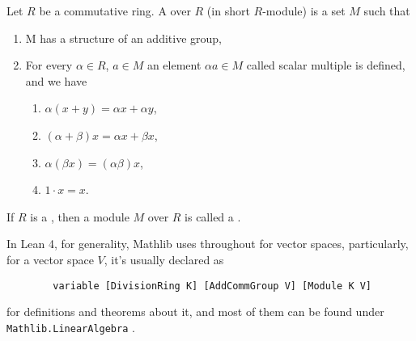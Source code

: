 \begin{definition}[Module]
    \label{Module}
    \leanok

    Let $R$ be a commutative ring. A  over $R$ (in short $R$-module) is a set $M$ such that

    \begin{enumerate}
      \item M has a structure of an additive group,
    
      \item For every $\alpha \in R$, $a \in M$ an element $\alpha a \in M$ called scalar multiple is defined, and we have
      
        \begin{enumerate}[i]
            \item $\alpha(x+y)=\alpha x+\alpha y$,
            \item $(\alpha+\beta) x=\alpha x+\beta x$,
            \item $\alpha(\beta x)=(\alpha \beta) x$,
            \item $1 \cdot x=x$.
        \end{enumerate}
    \end{enumerate}

\end{definition}

\begin{definition}
    \label{VectorSpace}
    \leanok

    If $R$ is a , then a module $M$ over $R$ is called a .

\end{definition}

\begin{remark}
    \label{mk:VectorSpace}

    In Lean 4, for generality, Mathlib uses  throughout for vector spaces,
    particularly, for a vector space $V$, it's usually declared as

    \begin{lstlisting}
        variable [DivisionRing K] [AddCommGroup V] [Module K V]
    \end{lstlisting}

    for definitions and theorems about it, and most of them can be found under \texttt{Mathlib.LinearAlgebra} .
    
\end{remark}

